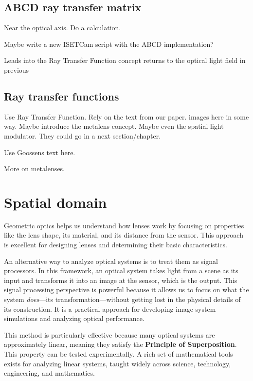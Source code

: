 \documentclass[
  letterpaper,
]{book}
\begin{document}
\section{ABCD ray transfer matrix}\label{sec-optics-abcd}

Near the optical axis. Do a calculation.

Maybe write a new ISETCam script with the ABCD implementation?

Leads into the Ray Transfer Function concept returns to the optical
light field in previous

\section{Ray transfer functions}\label{sec-optics-raytransfer}

Use Ray Transfer Function. Rely on the text from our paper. images here
in some way. Maybe introduce the metalens concept. Maybe even the
spatial light modulator. They could go in a next section/chapter.

Use Goossens text here.

More on metalenses.

\chapter{Spatial domain}\label{sec-optics-linear-space}

Geometric optics helps us understand how lenses work by focusing on
properties like the lens shape, its material, and its distance from the
sensor. This approach is excellent for designing lenses and determining
their basic characteristics.

An alternative way to analyze optical systems is to treat them as signal
processors. In this framework, an optical system takes light from a
scene as its input and transforms it into an image at the sensor, which
is the output. This signal processing perspective is powerful because it
allows us to focus on what the system \emph{does}---its
transformation---without getting lost in the physical details of its
construction. It is a practical approach for developing image system
simulations and analyzing optical performance.

This method is particularly effective because many optical systems are
approximately linear, meaning they satisfy the \textbf{Principle of
Superposition}. This property can be tested experimentally. A rich set
of mathematical tools exists for analyzing linear systems, taught widely
across science, technology, engineering, and mathematics.
\end{document}
